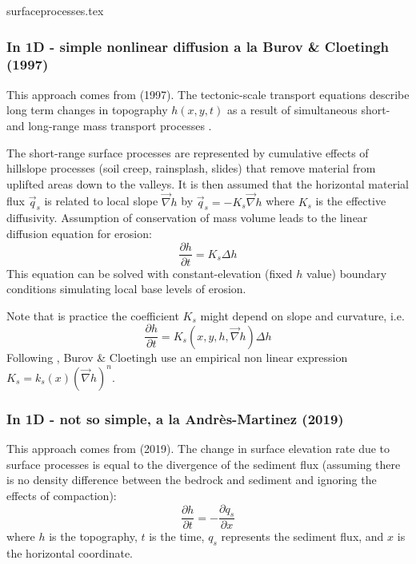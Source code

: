 \begin{flushright} {\tiny {\color{gray} surfaceprocesses.tex}} \end{flushright}

\subsubsection{In 1D - simple nonlinear diffusion a la Burov \& Cloetingh (1997)}

This approach comes from \textcite{bucl97} (1997).
The tectonic-scale transport equations describe long term changes
in topography $h(x,y,t)$ as a result of simultaneous short- and long-range
mass transport processes \cite{befh92,kobe94}.

The short-range surface processes are represented by cumulative effects of hillslope 
processes (soil creep, rainsplash, slides) that remove material from uplifted areas 
down to the valleys. 
It is then assumed that the horizontal material flux $\vec{q}_s$ is related to 
local slope $\vec\nabla h$ by $\vec{q}_s=-K_s \vec{\nabla}h$ 
where $K_s$ is the effective diffusivity. Assumption of conservation of mass 
volume leads to the linear diffusion equation for erosion:
\[
\frac{\partial h}{\partial t} = K_s \Delta h
\]
This equation can be solved with constant-elevation (fixed $h$ value)
boundary conditions simulating local base levels of erosion. 

Note that is practice the coefficient $K_s$ might depend on slope and curvature, 
i.e.
\[
\frac{\partial h}{\partial t} = K_s(x,y,h,\vec\nabla h)\Delta h
\]
Following \cite{goss76}, Burov \& Cloetingh use an empirical non linear 
expression $K_s=k_s(x) (\vec\nabla h)^n$. 




\subsubsection{In 1D - not so simple, a la Andr\`es-Martinez \etal (2019)}

This approach comes from \textcite{anpa19} (2019). 
The change in surface elevation rate due to surface processes is equal
to the divergence of the sediment flux 
(assuming there is no density difference between the bedrock and
sediment and ignoring the effects of compaction):
\[
\frac{\partial h}{\partial t} = -\frac{\partial q_s}{\partial x}
\]
where $h$ is the topography, $t$ is the time, $q_s$ represents the sediment flux, 
and $x$ is the horizontal coordinate. 

